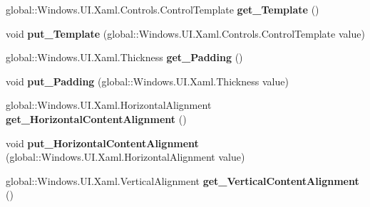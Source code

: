 \begin{DoxyCompactItemize}
global\+::\+Windows.\+U\+I.\+Xaml.\+Controls.\+Control\+Template {\bfseries get\+\_\+\+Template} ()
\item 
\mbox{\label{interface_windows_1_1_u_i_1_1_xaml_1_1_controls_1_1_i_control_a47a20a386ef872f62d75cd4371bdc883}} 
void {\bfseries put\+\_\+\+Template} (global\+::\+Windows.\+U\+I.\+Xaml.\+Controls.\+Control\+Template value)
\item 
\mbox{\label{interface_windows_1_1_u_i_1_1_xaml_1_1_controls_1_1_i_control_a452993e07931c19d328c465e2fbf9c1b}} 
global\+::\+Windows.\+U\+I.\+Xaml.\+Thickness {\bfseries get\+\_\+\+Padding} ()
\item 
\mbox{\label{interface_windows_1_1_u_i_1_1_xaml_1_1_controls_1_1_i_control_a0cb6fa986bebae13f4ec72989952a80f}} 
void {\bfseries put\+\_\+\+Padding} (global\+::\+Windows.\+U\+I.\+Xaml.\+Thickness value)
\item 
\mbox{\label{interface_windows_1_1_u_i_1_1_xaml_1_1_controls_1_1_i_control_ab7063d3439567f73075e2c9561509b3a}} 
global\+::\+Windows.\+U\+I.\+Xaml.\+Horizontal\+Alignment {\bfseries get\+\_\+\+Horizontal\+Content\+Alignment} ()
\item 
\mbox{\label{interface_windows_1_1_u_i_1_1_xaml_1_1_controls_1_1_i_control_aa4cc459384bbe6c700e3a0f0b23f633e}} 
void {\bfseries put\+\_\+\+Horizontal\+Content\+Alignment} (global\+::\+Windows.\+U\+I.\+Xaml.\+Horizontal\+Alignment value)
\item 
\mbox{\label{interface_windows_1_1_u_i_1_1_xaml_1_1_controls_1_1_i_control_ae586ce721d361940da51fcefd32816c7}} 
global\+::\+Windows.\+U\+I.\+Xaml.\+Vertical\+Alignment {\bfseries get\+\_\+\+Vertical\+Content\+Alignment} ()
\item 
\mbox{\label{interface_windows_1_1_u_i_1_1_xaml_1_1_controls_1_1_i_control_a44b19573be16bc17ab68814c38bc6981}} 

\end{DoxyCompactItemize}
